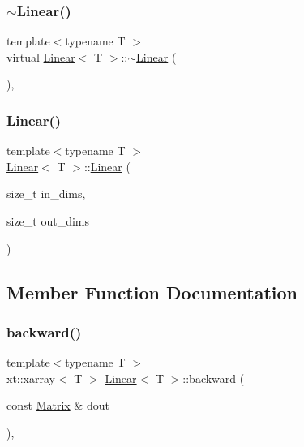 \subsubsection{\texorpdfstring{$\sim$Linear()}{~Linear()}}
{\footnotesize\ttfamily template$<$typename T $>$ \\
virtual \mbox{\hyperlink{class_linear}{Linear}}$<$ T $>$\+::$\sim$\mbox{\hyperlink{class_linear}{Linear}} (\begin{DoxyParamCaption}{ }\end{DoxyParamCaption})\hspace{0.3cm}{\ttfamily [virtual]}, {\ttfamily [default]}}

\mbox{\label{class_linear_a335a168705982b1dbf9c16b89465995e}} 
\subsubsection{\texorpdfstring{Linear()}{Linear()}\hspace{0.1cm}{\footnotesize\ttfamily [2/2]}}
{\footnotesize\ttfamily template$<$typename T $>$ \\
\mbox{\hyperlink{class_linear}{Linear}}$<$ T $>$\+::\mbox{\hyperlink{class_linear}{Linear}} (\begin{DoxyParamCaption}\item[{size\+\_\+t}]{in\+\_\+dims,  }\item[{size\+\_\+t}]{out\+\_\+dims }\end{DoxyParamCaption})}



\subsection{Member Function Documentation}
\mbox{\label{class_linear_a747db1996e723fae7c9713d4b7f303af}} 
\subsubsection{\texorpdfstring{backward()}{backward()}}
{\footnotesize\ttfamily template$<$typename T $>$ \\
xt\+::xarray$<$ T $>$ \mbox{\hyperlink{class_linear}{Linear}}$<$ T $>$\+::backward (\begin{DoxyParamCaption}\item[{const \mbox{\hyperlink{class_layer_a22b1e7286096aa62bd245536c8ebdaf1}{Matrix}} \&}]{dout }\end{DoxyParamCaption})\hspace{0.3cm}{\ttfamily [override]}, {\ttfamily [virtual]}}



